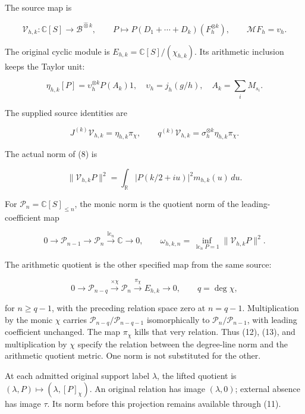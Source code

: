 The source map is

\[
 \mathcal V_{h,k}:\mathbb{C}[S]\longrightarrow\mathscr B^{\widehat\otimes k},
 \qquad P\longmapsto P(D_1+\cdots+D_k)(F_h^{\otimes k}),\qquad
 \mathcal MF_h=v_h.                                                    \tag{8}
\]

The original cyclic module is \(E_{h,k}=\mathbb{C}[S]/(\chi_{h,k})\). Its
arithmetic inclusion keeps the Taylor unit:

\[
 \eta_{h,k}[P]=\upsilon_h^{\otimes k}P(A_k)1,\quad
 \upsilon_h=j_h(g/h),\quad A_k=\sum_iM_{s_i}.                           \tag{9}
\]

The supplied source identities are

\[
 J^{(k)}\mathcal V_{h,k}=\eta_{h,k}\pi_\chi,\qquad
 q^{(k)}\mathcal V_{h,k}=\sigma_h^{\otimes k}\eta_{h,k}\pi_\chi.          \tag{10}
\]

The actual norm of (8) is

\[
 \|\mathcal V_{h,k}P\|^2
 =\int_{\mathbb{R}}|P(k/2+iu)|^2m_{h,k}(u)\,du.                          \tag{11}
\]

For \(\mathcal P_n=\mathbb{C}[S]_{\le n}\), the monic norm is the
quotient norm of the leading-coefficient map

\[
 0\longrightarrow\mathcal P_{n-1}\longrightarrow\mathcal P_n
 \xrightarrow{\operatorname{lc}_n}\mathbb{C}\longrightarrow0,
 \qquad
 \omega_{h,k,n}=\inf_{\operatorname{lc}_nP=1}\|\mathcal V_{h,k}P\|^2.
                                                                         \tag{12}
\]

The arithmetic quotient is the other specified map from the same source:

\[
 0\longrightarrow\mathcal P_{n-q}
 \xrightarrow{\times\chi}\mathcal P_n
 \xrightarrow{\pi_\chi}E_{h,k}\longrightarrow0,\qquad q=\deg\chi,
                                                                         \tag{13}
\]

for \(n\ge q-1\), with the preceding relation space zero at \(n=q-1\).
Multiplication by the monic \(\chi\) carries
\(\mathcal P_{n-q}/\mathcal P_{n-q-1}\) isomorphically to
\(\mathcal P_n/\mathcal P_{n-1}\), with leading coefficient unchanged.
The map \(\pi_\chi\) kills that very relation. Thus (12), (13), and
multiplication by \(\chi\) specify the relation between the degree-line
norm and the arithmetic quotient metric. One norm is not substituted for
the other.

At each admitted original support label \(\lambda\), the lifted quotient
is \((\lambda,P)\mapsto(\lambda,[P]_\chi)\). An original relation has
image \((\lambda,0)\); external absence has image \(\tau\). Its norm
before this projection remains available through (11).

